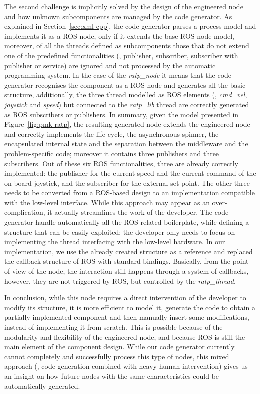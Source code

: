 The second challenge is implicitly solved by the design of the engineered node and how unknown subcomponents are managed by the code generator.  As explained in Section~\ref{sec:xml-cpp}, the code generator parses a process model and implements it as a ROS node, only if it extends the base ROS node model, moreover, of all the threads defined as subcomponents those that do not extend one of the predefined functionalities (\ie, publisher, subscriber, subscriber with publisher or service) are ignored and not processed by the automatic programming system. In the case of the \textit{ratp\_node} it means that the code generator recognises the component as a ROS node and generates all the basic structure, additionally, the three thread modelled as ROS elements (\ie, \textit{cmd\_vel}, \textit{joystick} and \textit{speed}) but connected to the \textit{ratp\_lib} thread are correctly generated as ROS subscribers or publishers. In summary, given the model presented in Figure~\ref{fig:pmk-ratp}, the resulting generated node extends the engineered node and correctly implements the life cycle, the asynchronous spinner, the encapsulated internal state and the separation between the middleware and the problem-specific code; moreover it contains three publishers and three subscribers. Out of these six ROS functionalities, three are already correctly implemented: the publisher for the current speed and the current command of the on-board joystick, and the subscriber for the external set-point. The other three needs to be converted from a ROS-based design to an implementation compatible with the low-level interface. While this approach may appear as an over-complication, it actually streamlines the work of the developer. The code generator handle automatically all the ROS-related boilerplate, while defining a structure that can be easily exploited; the developer only needs to focus on implementing the thread interfacing with the low-level hardware. In our implementation, we use the already created structure as a reference and replaced the callback structure of ROS with standard bindings. Basically, from the point of view of the node, the interaction still happens through a system of callbacks, however, they are not triggered by ROS, but controlled by the \textit{ratp\_thread}. 

In conclusion, while this node requires a direct intervention of the developer to modify its structure, it is more efficient to model it, generate the code to obtain a partially implemented component and then manually insert some modifications, instead of implementing it from scratch. This is possible because of the modularity and flexibility of the engineered node, and because ROS is still the main element of the component design. While our code generator currently cannot completely and successfully process this type of nodes, this mixed approach (\ie, code generation combined with heavy human intervention) gives us an insight on how future nodes with the same characteristics could be automatically generated.



